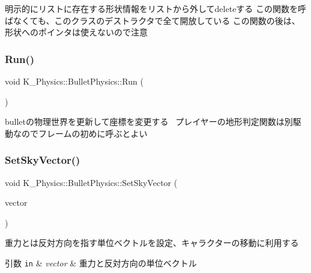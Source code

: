 明示的にリストに存在する形状情報をリストから外してdeleteする この関数を呼ばなくても、このクラスのデストラクタで全て開放している この関数の後は、形状へのポインタは使えないので注意 

\mbox{\label{class_k___physics_1_1_bullet_physics_a251957471a8ab4f8bbace69c995d325f}} 
\subsubsection{\texorpdfstring{Run()}{Run()}}
{\footnotesize\ttfamily void K\+\_\+\+Physics\+::\+Bullet\+Physics\+::\+Run (\begin{DoxyParamCaption}{ }\end{DoxyParamCaption})}



bulletの物理世界を更新して座標を変更する~\newline
プレイヤーの地形判定関数は別駆動なのでフレームの初めに呼ぶとよい 

\mbox{\label{class_k___physics_1_1_bullet_physics_ac9b3ed073b61a866485f462fa98ec14c}} 
\subsubsection{\texorpdfstring{Set\+Sky\+Vector()}{SetSkyVector()}}
{\footnotesize\ttfamily void K\+\_\+\+Physics\+::\+Bullet\+Physics\+::\+Set\+Sky\+Vector (\begin{DoxyParamCaption}\item[{const bt\+Vector3 \&}]{vector }\end{DoxyParamCaption})}



重力とは反対方向を指す単位ベクトルを設定、キャラクターの移動に利用する 


\begin{DoxyParams}[1]{引数}
\mbox{\tt in}  & {\em vector} & 重力と反対方向の単位ベクトル \\
\hline
\end{DoxyParams}
